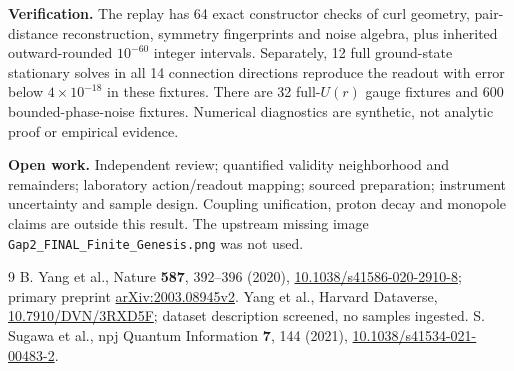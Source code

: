 \documentclass[11pt,a4paper]{article}
\begin{document}
\textbf{Verification.} The replay has 64 exact constructor checks of curl geometry, pair-distance reconstruction, symmetry fingerprints and noise algebra, plus inherited outward-rounded $10^{-60}$ integer intervals. Separately, 12 full ground-state stationary solves in all 14 connection directions reproduce the readout with error below $4\times10^{-18}$ in these fixtures. There are 32 full-$U(r)$ gauge fixtures and 600 bounded-phase-noise fixtures. Numerical diagnostics are synthetic, not analytic proof or empirical evidence.

\textbf{Open work.} Independent review; quantified validity neighborhood and remainders; laboratory action/readout mapping; sourced preparation; instrument uncertainty and sample design. Coupling unification, proton decay and monopole claims are outside this result. The upstream missing image \texttt{Gap2\_FINAL\_Finite\_Genesis.png} was not used.

\begin{thebibliography}{9}\small
{} B. Yang et al., Nature \textbf{587}, 392--396 (2020), \href{https://doi.org/10.1038/s41586-020-2910-8}{10.1038/s41586-020-2910-8}; primary preprint \href{https://arxiv.org/html/2003.08945v2}{arXiv:2003.08945v2}.
 Yang et al., Harvard Dataverse, \href{https://doi.org/10.7910/DVN/3RXD5F}{10.7910/DVN/3RXD5F}; dataset description screened, no samples ingested.
 S. Sugawa et al., npj Quantum Information \textbf{7}, 144 (2021), \href{https://doi.org/10.1038/s41534-021-00483-2}{10.1038/s41534-021-00483-2}.
\end{thebibliography}
\end{document}
